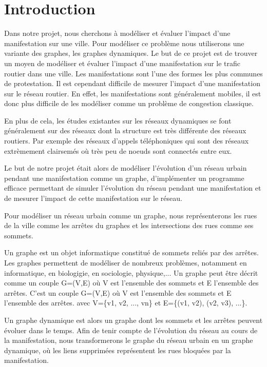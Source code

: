 \newpage
\section{Introduction} \label{sec:introduction}

Dans notre projet, nous cherchons à modéliser et évaluer l'impact d'une manifestation sur 
une ville. Pour modéliser ce problème nous utiliserons une variante des graphes, les graphes dynamiques.
Le but de ce projet est de trouver un moyen de modéliser et évaluer l'impact d'une manifestation 
sur le trafic routier dans une ville. Les manifestations sont l'une des formes les plus communes
de protestation. Il est cependant difficile de mesurer l'impact d'une manifestation sur le réseau routier. 
En effet, les manifestations sont généralement mobiles, il est donc plus difficile de les 
modéliser comme un problème de congestion classique. 

En plus de cela, les études existantes sur les réseaux dynamiques se font généralement sur des réseaux 
dont la structure est très différente des réseaux routiers. Par exemple des réseaux d'appels téléphoniques 
qui sont des réseaux extrèmement clairsemés où très peu de noeuds sont connectés entre eux.

Le but de notre projet était alors de modéliser l'évolution d'un réseau urbain pendant une manifestation comme 
un graphe, d'implémenter un programme efficace permettant de simuler l'évolution du réseau pendant une manifestation et 
de mesurer l'impact de cette manifestation sur le réseau.

Pour modéliser un réseau urbain comme un graphe, nous représenterons les rues de la ville comme les arrêtes du graphes
et les intersections des rues comme ses sommets.

Un graphe est un objet informatique constitué de sommets reliés par des arrêtes. 
Les graphes permettent de modéliser de nombreux problèmes, notamment en informatique, en biologigie, en sociologie,
physique,... 
Un graphe peut être décrit comme un couple G=(V,E) où V est l'ensemble des sommets et E l'ensemble des arrêtes.
C'est un couple G=(V,E) où V est l'ensemble des sommets et E l'ensemble des arrêtes.
avec V=\{v1, v2, ..., vn\} et E=\{(v1, v2), (v2, v3), ...\}.

Un graphe dynamique est alors un graphe dont les sommets et les arrêtes peuvent évoluer dans le temps.
Afin de tenir compte de l'évolution du réseau au cours de la manifestation, nous transformerons le graphe du réseau urbain 
en un graphe dynamique\cite{dynamic_graphs}, où les liens supprimées représentent les rues bloquées par la manifestation.


